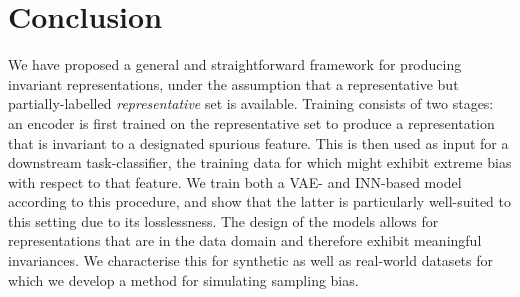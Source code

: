 \section{Conclusion}\label{sec:nifr-conclusion}
%
We have proposed a general and straightforward framework for producing invariant representations,
under the assumption that a representative but partially-labelled \emph{representative} set is
available. 
%
Training consists of two stages: an encoder is first trained on the representative set to produce a
representation that is invariant to a designated spurious feature. 
%
This is then used as input for a downstream task-classifier, the training data for which might
exhibit extreme bias with respect to that feature. 
%
We train both a \acs{VAE}- and \acs{INN}-based model according to this procedure, and show that the
latter is particularly well-suited to this setting due to its losslessness. 
%
The design of the models allows for representations that are in the data domain and therefore
exhibit meaningful invariances. 
%
We characterise this for synthetic as well as real-world datasets for which we develop a method for
simulating sampling bias.
%
